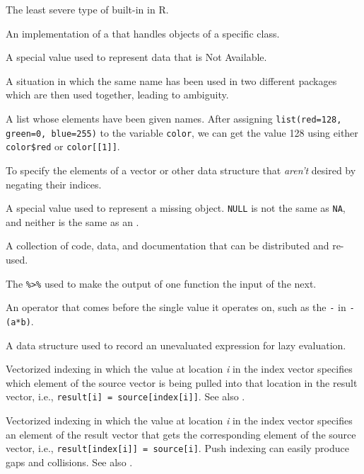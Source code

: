 \begin{description}
The least severe type of built-in  in R.

An implementation of a 
that handles objects of a specific class.

A special value used to represent data that is Not Available.

A situation in which the same name has been used in two different packages
which are then used together,
leading to ambiguity.

A list whose elements have been given names.
After assigning \texttt{list(red=128, green=0, blue=255)} to the variable \texttt{color},
we can get the value 128 using either \texttt{color\$red} or \texttt{color[[1]]}.

To specify the elements of a vector or other data structure that \emph{aren't} desired
by negating their indices.

A special value used to represent a missing object.
\texttt{NULL} is not the same as \texttt{NA},
and neither is the same as an .

A collection of code, data, and documentation
that can be distributed and re-used.

The \texttt{\%\textgreater{}\%} used to make the output of one function the input of the next.

An operator that comes before the single value it operates on,
such as the \texttt{-} in \texttt{-(a*b)}.

A data structure used to record an unevaluated expression for lazy evaluation.

Vectorized indexing in which the value at location \emph{i} in the index vector
specifies which element of the source vector
is being pulled into that location in the result vector,
i.e., \texttt{result[i]\ =\ source[index[i]]}.
See also .

Vectorized indexing in which the value at location \emph{i} in the index vector
specifies an element of the result vector that gets the corresponding element of the source vector,
i.e., \texttt{result[index[i]]\ =\ source[i]}.
Push indexing can easily produce gaps and collisions.
See also .


\end{description}
